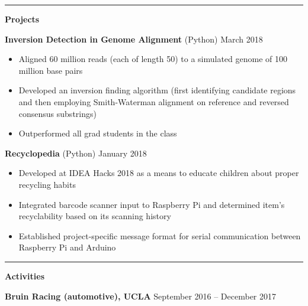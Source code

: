 \documentclass[11pt]{article}
\begin{document}
\rule[10pt]{\textwidth}{.75pt} \vspace{-20pt}
\setlength{\parindent}{0.55em}\par
\textbf{\Large Projects} \vspace{4pt}\setlength{\parindent}{1.5em}\par
\textbf{Inversion Detection in Genome Alignment} (Python) \hfill March 2018 \vspace{-6pt} \setlength{\parindent}{3em}\par 
\begin{itemize}[leftmargin=15.2mm]
	\setlength\itemsep{-.4em}
	\item Aligned 60 million reads (each of length 50) to a simulated genome of 100 million base pairs
	\item Developed an inversion finding algorithm (first identifying candidate regions and then employing Smith-Waterman alignment on reference and reversed consensus substrings)
	\item Outperformed all grad students in the class
\end{itemize} \vspace{-6pt} \setlength{\parindent}{1.5em}\par
\textbf{Recyclopedia} (Python) \hfill January 2018 \vspace{-6pt} \setlength{\parindent}{3em}\par 
\begin{itemize}[leftmargin=15.2mm]
	\setlength\itemsep{-.4em}
	\item Developed at IDEA Hacks 2018 as a means to educate children about proper recycling habits
	\item Integrated barcode scanner input to Raspberry Pi and determined item's recyclability based on its scanning history
	\item Established project-specific message format for serial communication between Raspberry Pi and Arduino
\end{itemize}
\rule[10pt]{\textwidth}{.75pt} \vspace{-20pt}
\setlength{\parindent}{0.55em}\par
\textbf{\Large Activities} \vspace{4pt}\setlength{\parindent}{1.5em}\par
\textbf{Bruin Racing (automotive), UCLA} \hfill September 2016 -- December 2017 \vspace{-6pt} \setlength{\parindent}{3em}\par 
\end{document}
